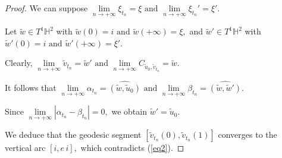 \documentclass[10pt,a4paper]{amsart}
\begin{document}
\begin{proof}
We can suppose
$
\lim\limits_{n\to+\infty}\xi_{t_{n}}=\xi
\text{ and }
\lim\limits_{n\to+\infty}\xi_{t_{n}}'=\xi'.
$

Let $\tilde w\in T^{1}\mathbb H^{2}$ with
$
\tilde w(0)=i
\text{ and }
\tilde w(+\infty)=\xi,
$
and $\tilde w'\in T^{1}\mathbb H^{2}$ with
$
\tilde w'(0)=i
\text{ and } 
\tilde w'(+\infty)=\xi'.
$

Clearly,
$
\lim\limits_{n\to+\infty}\tilde v_{t_{n}}=\tilde w'
\text{ and } 
\lim\limits_{n\to+\infty} C_{\tilde u_{0},\tilde v_{t_{n}}}=\tilde w.
$

It follows that
$
\lim\limits_{n\to+\infty}\alpha_{t_{n}}=\widehat{(\tilde w,\tilde u_{0})}
\text{ and } 
\lim\limits_{n\to+\infty}\beta_{t_{n}}=\widehat{(\tilde w,\tilde w')}.
$ 

Since
$
\lim\limits_{n\to+\infty}|\alpha_{t_{n}}-\beta_{t_{n}}|=0,
$
we obtain
$
\tilde w'=\tilde u_{0}.
$

We deduce that the geodesic segment
$
[\tilde v_{t_{n}}(0),\tilde v_{t_{n}}(1)]
$
converges to the vertical arc
$
[i,e\,i],
$
which contradicts (\ref{eq2}).
\end{proof}
\end{document}
